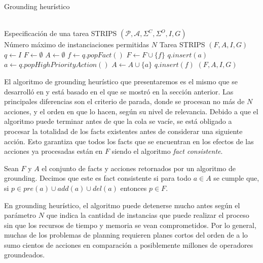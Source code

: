 \begin{algorithm}
    \caption{Grounding heurístico}\label{alg:grounding-heuristico}
    \begin{algorithmic}
    \Require 
        \\Especificación de una tarea STRIPS $(\mathcal{P}, \mathcal{A}, \Sigma^{C}, \Sigma^{O}, I, G)$ \\
        Número máximo de instanciaciones permitidas $N$
    \Ensure Tarea STRIPS $(F, A, I, G)$
    \State $q \gets I$
    \State $F \gets \emptyset$
    \State $A \gets \emptyset$
        \State $f \gets q.popFact()$
        \State $F \gets F \cup \{f\}$
            \State $q.insert(a)$
        \EndFor
    \Else
        \State $a \gets q.popHighPriorityAction()$
        \State $A \gets A \cup \{a\}$
            \State $q.insert(f)$
        \EndFor
    \EndIf
    \EndWhile
    \State \Return $(F, A, I, G)$
    \end{algorithmic}
\end{algorithm}

El algoritmo de grounding heurístico que presentaremos es el mismo que se
desarrolló en \citep{Gnad_Torralba_Dominguez_Areces_Bustos_2019} y está basado
en el que se mostró en la sección anterior. Las principales diferencias son el
criterio de parada, donde se procesan no más de $N$ acciones, y el orden en que
lo hacen, según su nivel de relevancia. Debido a que el algoritmo puede
terminar antes de que la cola se vacíe, se está obligado a procesar la totalidad
de los facts existentes antes de considerar una siguiente acción. Esto garantiza
que todos los facts que se encuentran en los efectos de las acciones ya
procesadas están en $F$ siendo el algoritmo \emph{fact consistente}.

\begin{mydef}
    Sean $F$ y $A$ el conjunto de facts y acciones retornados por un algoritmo
    de grounding. Decimos que este es fact consistente si para todo $a \in A$ se
    cumple que, si $p \in pre(a) \cup add(a) \cup del(a)$ entonces $p \in F$.
\end{mydef}

En grounding heurístico, el algoritmo puede detenerse mucho antes según el
parámetro $N$ que indica la cantidad de instancias que puede realizar el proceso
sin que los recursos de tiempo y memoria se vean comprometidos. Por lo general,
muchas de los problemas de planning requieren planes cortos del orden de a lo
sumo cientos de acciones en comparación a posiblemente millones de operadores
groundeados.

